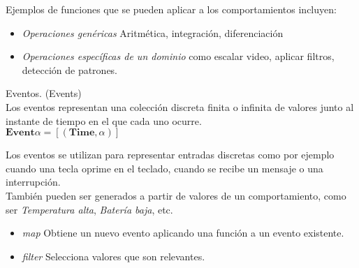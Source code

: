   Ejemplos de funciones que se pueden aplicar a los
comportamientos incluyen:

\begin{itemize}
\item \textit{Operaciones genéricas} Aritmética, integración, diferenciación
\item \textit{Operaciones específicas de un dominio} como escalar video, aplicar filtros, detección de patrones.
\end{itemize}



\begin{definicion}
  Eventos. (Events)\\

  Los eventos representan una colección discreta finita o infinita de valores
  junto al instante de tiempo en el que cada uno ocurre.\\

  $\textbf{Event} \alpha = [(\textbf{Time}, \alpha)]$

\end{definicion}

  Los eventos se utilizan para representar entradas discretas como por
ejemplo cuando una tecla oprime en el teclado, cuando se recibe un
mensaje o una interrupción.\\
  También pueden ser generados a partir de valores de un comportamiento,
como ser \emph{Temperatura alta}, \emph{Batería baja}, etc.

\begin{itemize}
  \item {
      \textit{map} Obtiene un nuevo evento aplicando una función
                   a un evento existente.
  }
  \item {
      \textit{filter} Selecciona valores que son relevantes.
  }
\end{itemize}

 
